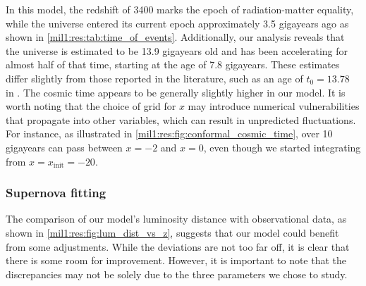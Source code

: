 
In this model, the redshift of 3400 marks the epoch of radiation-matter equality, while the universe entered its current epoch approximately 3.5 gigayears ago as shown in \cref{mil1:res:tab:time_of_events}. Additionally, our analysis reveals that the universe is estimated to be 13.9 gigayears old and has been accelerating for almost half of that time, starting at the age of 7.8 gigayears. These estimates differ slightly from those reported in the literature, such as an age of $t_0=13.78$ in \citep{DodelsonBook}. The cosmic time appears to be generally slightly higher in our model. It is worth noting that the choice of grid for $x$ may introduce numerical vulnerabilities that propagate into other variables, which can result in unpredicted fluctuations. For instance, as illustrated in \cref{mil1:res:fig:conformal_cosmic_time}, over 10 gigayears can pass between $x=-2$ and $x=0$, even though we started integrating from $x=x_\mathrm{init}=-20$.



\subsubsection{Supernova fitting}
    The comparison of our model's luminosity distance with observational data, as shown in \cref{mil1:res:fig:lum_dist_vs_z}, suggests that our model could benefit from some adjustments. While the deviations are not too far off, it is clear that there is some room for improvement. However, it is important to note that the discrepancies may not be solely due to the three parameters we chose to study. 

